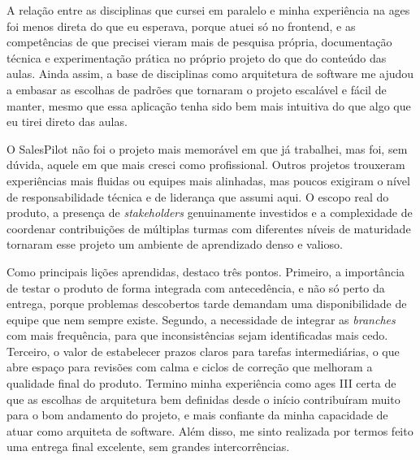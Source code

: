 A relação entre as disciplinas que cursei em paralelo e minha experiência na \ac{ages} foi menos direta do que eu esperava, porque atuei só no frontend, e as competências de que precisei vieram mais de pesquisa própria, documentação técnica e experimentação prática no próprio projeto do que do conteúdo das aulas. Ainda assim, a base de disciplinas como arquitetura de software me ajudou a embasar as escolhas de padrões que tornaram o projeto escalável e fácil de manter, mesmo que essa aplicação tenha sido bem mais intuitiva do que algo que eu tirei direto das aulas.

O SalesPilot não foi o projeto mais memorável em que já trabalhei, mas foi, sem dúvida, aquele em que mais cresci como profissional. Outros projetos trouxeram experiências mais fluidas ou equipes mais alinhadas, mas poucos exigiram o nível de responsabilidade técnica e de liderança que assumi aqui. O escopo real do produto, a presença de \textit{stakeholders} genuinamente investidos e a complexidade de coordenar contribuições de múltiplas turmas com diferentes níveis de maturidade tornaram esse projeto um ambiente de aprendizado denso e valioso.

Como principais lições aprendidas, destaco três pontos. Primeiro, a importância de testar o produto de forma integrada com antecedência, e não só perto da entrega, porque problemas descobertos tarde demandam uma disponibilidade de equipe que nem sempre existe. Segundo, a necessidade de integrar as \textit{branches} com mais frequência, para que inconsistências sejam identificadas mais cedo. Terceiro, o valor de estabelecer prazos claros para tarefas intermediárias, o que abre espaço para revisões com calma e ciclos de correção que melhoram a qualidade final do produto. Termino minha experiência como \ac{ages} III certa de que as escolhas de arquitetura bem definidas desde o início contribuíram muito para o bom andamento do projeto, e mais confiante da minha capacidade de atuar como arquiteta de software. Além disso, me sinto realizada por termos feito uma entrega final excelente, sem grandes intercorrências.
